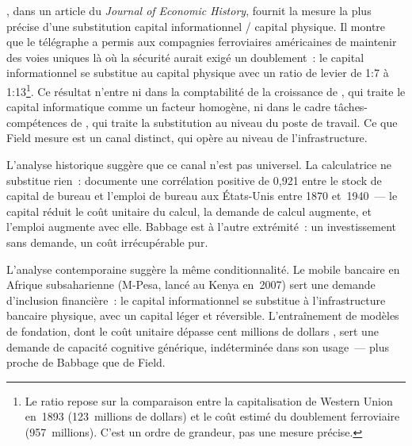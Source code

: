 \markREG
\textcite{field_magnetic_1992}, dans un article du \emph{Journal of Economic History}, fournit la mesure la plus précise d'une substitution capital informationnel / capital physique. Il montre que le télégraphe a permis aux compagnies ferroviaires américaines de maintenir des voies uniques là où la sécurité aurait exigé un doublement~: le capital informationnel se substitue au capital physique avec un ratio de levier de 1:7 à 1:13\footnote{Le ratio repose sur la comparaison entre la capitalisation de Western Union en~1893 (123~millions de dollars) et le coût estimé du doublement ferroviaire (957~millions). C'est un ordre de grandeur, pas une mesure précise.}. Ce résultat n'entre ni dans la comptabilité de la croissance de \textcite{jorgenson_information_2001}, qui traite le capital informatique comme un facteur homogène, ni dans le cadre tâches-compétences de \textcite{autor_skill_2003}, qui traite la substitution au niveau du poste de travail. Ce que Field mesure est un canal distinct, qui opère au niveau de l'infrastructure.

L'analyse historique suggère que ce canal n'est pas universel. La calculatrice ne substitue rien~: \textcite{reinstaller_historical_2001} documente une corrélation positive de 0,921 entre le stock de capital de bureau et l'emploi de bureau aux États-Unis entre 1870 et~1940~--- le capital réduit le coût unitaire du calcul, la demande de calcul augmente, et l'emploi augmente avec elle. Babbage est à l'autre extrémité~: un investissement sans demande, un coût irrécupérable pur.

L'analyse contemporaine suggère la même conditionnalité. Le mobile bancaire en Afrique subsaharienne (M-Pesa, lancé au Kenya en~2007) sert une demande d'inclusion financière~: le capital informationnel se substitue à l'infrastructure bancaire physique, avec un capital léger et réversible. L'entraînement de modèles de fondation, dont le coût unitaire dépasse cent millions de dollars \parencite{cottier_rising_2025}, sert une demande de capacité cognitive générique, indéterminée dans son usage~--- plus proche de Babbage que de Field.


